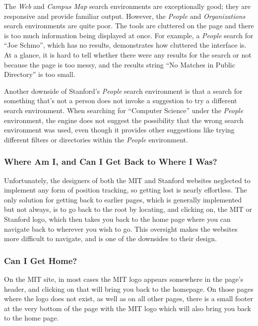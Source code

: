 The \textsl{Web} and \textsl{Campus Map} search environments are exceptionally good;
they are responsive and provide familiar output. However, the \textsl{People} and
\textsl{Organizations} search environments are quite poor. The tools are
cluttered on the page and there is too much information being displayed at once.
For example, a \textsl{People} search for ``Joe Schmo'', which has no results,
demonstrates how cluttered the interface is. At a glance, it is hard to tell
whether there were any results for the search or not because the page is too
messy, and the results string ``No Matches in Public Directory'' is too small.

Another downside of Stanford's \textsl{People} search environment is that a search
for something that's not a person does not invoke a suggestion to try a different
search environment. When searching for ``Computer Science'' under the \textsl{People}
environment, the engine does not suggest the possibility that the wrong search
environment was used, even though it provides other suggestions like trying
different filters or directories within the \textsl{People} environment.

\subsubsection*{Where Am I, and Can I Get Back to Where I Was?}

Unfortunately, the designers of both the MIT and Stanford websites neglected to
implement any form of position tracking, so getting lost is nearly effortless.
The only solution for getting back to earlier pages, which is generally implemented
but not always, is to go back to the root by locating, and clicking on, the MIT or
Stanford logo, which then takes you back to the home page where you can navigate
back to wherever you wish to go. This oversight makes the websites more
difficult to navigate, and is one of the downsides to their design.

\subsubsection*{Can I Get Home?}

On the MIT site, in most cases the MIT logo appears somewhere in the page's header, and clicking on that
will bring you back to the homepage. On those pages where the logo does not exist, as well as
on all other pages, there is a small footer at the very bottom of the page with the MIT logo
which will also bring you back to the home page.

